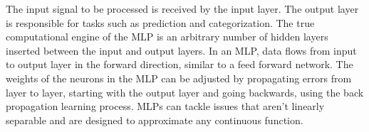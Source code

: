 The input signal to be processed is received by the input layer. The output layer is responsible for tasks such as prediction and categorization. The true computational engine of the MLP is an arbitrary number of hidden layers inserted between the input and output layers. In an MLP, data flows from input to output layer in the forward direction, similar to a feed forward network. The weights of the neurons in the MLP can be adjusted by propagating errors from layer to layer, starting with the output layer and going backwards, using the back propagation learning process. MLPs can tackle issues that aren't linearly separable and are designed to approximate any continuous function.
